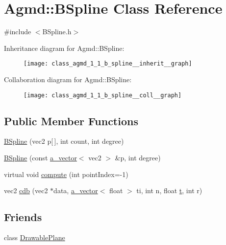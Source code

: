\hypertarget{class_agmd_1_1_b_spline}{\section{Agmd\+:\+:B\+Spline Class Reference}
\label{class_agmd_1_1_b_spline}
}


{\ttfamily \#include $<$B\+Spline.\+h$>$}



Inheritance diagram for Agmd\+:\+:B\+Spline\+:\nopagebreak
\begin{figure}[H]
\begin{center}
\leavevmode
\texttt{[image: class\_agmd\_1\_1\_b\_spline\_\_inherit\_\_graph]}
\end{center}
\end{figure}


Collaboration diagram for Agmd\+:\+:B\+Spline\+:\nopagebreak
\begin{figure}[H]
\begin{center}
\leavevmode
\texttt{[image: class\_agmd\_1\_1\_b\_spline\_\_coll\_\_graph]}
\end{center}
\end{figure}
\subsection*{Public Member Functions}
\begin{DoxyCompactItemize}
\item 
\hyperlink{class_agmd_1_1_b_spline_a8046af3910354146765ff276d13671d4}{B\+Spline} (vec2 p\mbox{[}$\,$\mbox{]}, int count, int degree)
\item 
\hyperlink{class_agmd_1_1_b_spline_a3d20dd969b2dc4f868f28ca90a7c4ca9}{B\+Spline} (const \hyperlink{_vector_8h_a3df82cea60ff4ad0acb44e58454406a5}{a\+\_\+vector}$<$ vec2 $>$ \&p, int degree)
\item 
virtual void \hyperlink{class_agmd_1_1_b_spline_a00da37dc51263b61be82f3ff933b392e}{compute} (int point\+Index=-\/1)
\item 
vec2 \hyperlink{class_agmd_1_1_b_spline_a6f84080be4ae3e90fb32725606ae7bb5}{cdb} (vec2 $\ast$data, \hyperlink{_vector_8h_a3df82cea60ff4ad0acb44e58454406a5}{a\+\_\+vector}$<$ float $>$ ti, int n, float \hyperlink{_examples_2_planet_2_app_8cpp_a125ce9f8ead659256dbdd0816ede24d4}{t}, int r)
\end{DoxyCompactItemize}
\subsection*{Friends}
\begin{DoxyCompactItemize}
\item 
class \hyperlink{class_agmd_1_1_b_spline_abd140f9d7517b23f834000b9238bd85f}{Drawable\+Plane}
\end{DoxyCompactItemize}
